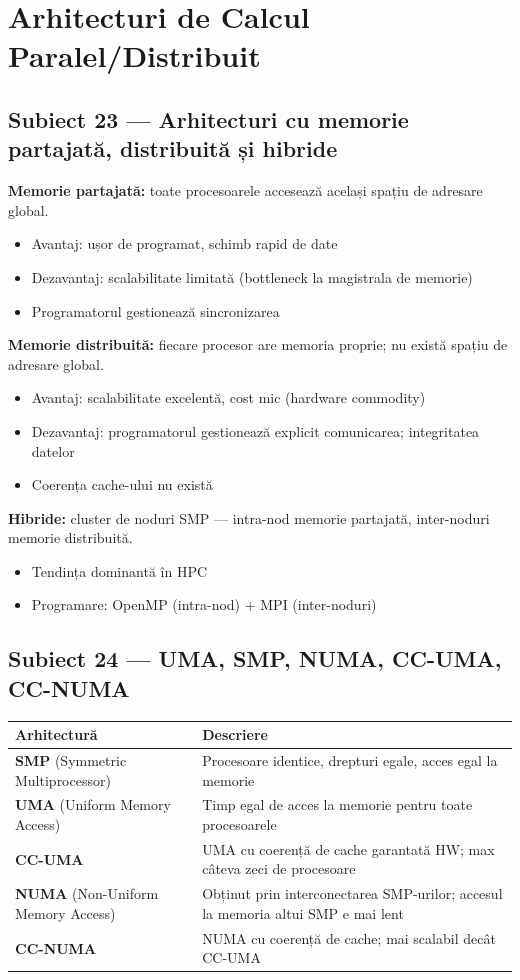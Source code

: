 \documentclass[a4paper,11pt]{article}
\newcommand{\thead}[1]{\cellcolor{tblh}\color{white}\textbf{#1}}
\newcommand{\subiect}[2]{\subsection{Subiect \textcolor{numcol}{#1} — #2}}
\begin{document}
\section{Arhitecturi de Calcul Paralel/Distribuit}

\subiect{23}{Arhitecturi cu memorie partajată, distribuită și hibride}

\textbf{Memorie partajată:} toate procesoarele accesează același spațiu de adresare global.
\begin{itemize}[noitemsep]
  \item Avantaj: ușor de programat, schimb rapid de date
  \item Dezavantaj: scalabilitate limitată (bottleneck la magistrala de memorie)
  \item Programatorul gestionează sincronizarea
\end{itemize}

\textbf{Memorie distribuită:} fiecare procesor are memoria proprie; nu există spațiu de adresare global.
\begin{itemize}[noitemsep]
  \item Avantaj: scalabilitate excelentă, cost mic (hardware commodity)
  \item Dezavantaj: programatorul gestionează explicit comunicarea; integritatea datelor
  \item Coerența cache-ului nu există
\end{itemize}

\textbf{Hibride:} cluster de noduri SMP — intra-nod memorie partajată, inter-noduri memorie distribuită.
\begin{itemize}[noitemsep]
  \item Tendința dominantă în HPC
  \item Programare: OpenMP (intra-nod) + MPI (inter-noduri)
\end{itemize}

\subiect{24}{UMA, SMP, NUMA, CC-UMA, CC-NUMA}

\begin{center}
\begin{tabularx}{\textwidth}{lX}
\toprule
\thead{Arhitectură} & \thead{Descriere} \\
\midrule
\textbf{SMP} (Symmetric Multiprocessor) & Procesoare identice, drepturi egale, acces egal la memorie \\
\textbf{UMA} (Uniform Memory Access) & Timp egal de acces la memorie pentru toate procesoarele \\
\textbf{CC-UMA} & UMA cu coerență de cache garantată HW; max câteva zeci de procesoare \\
\textbf{NUMA} (Non-Uniform Memory Access) & Obținut prin interconectarea SMP-urilor; accesul la memoria altui SMP e mai lent \\
\textbf{CC-NUMA} & NUMA cu coerență de cache; mai scalabil decât CC-UMA \\
\bottomrule
\end{tabularx}
\end{center}
\end{document}
